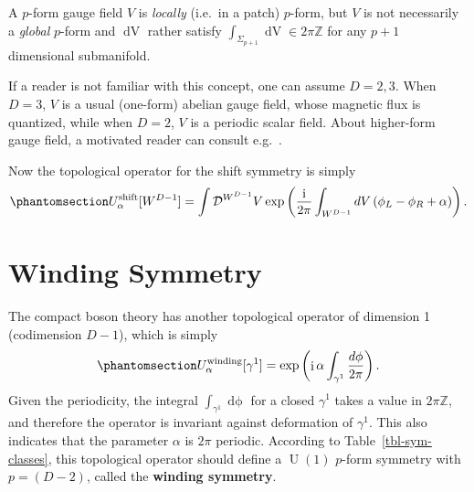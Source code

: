 \documentclass[11pt,toc=bibliography]{scrbook}
\DeclareMathOperator{\U}{U}
\DeclareMathOperator{\imunit}{i}
\newcommand{\stdim}{D}
\numberwithin{equation}{section}
\DeclareMathOperator{\U}{U}
\DeclareMathOperator{\imunit}{i}
\newcommand{\stdim}{D}
\begin{document}
\begin{tcolorbox}[enhanced jigsaw, opacityback=0, opacitybacktitle=0.6, leftrule=.75mm, arc=.35mm, coltitle=black, breakable, colframe=quarto-callout-note-color-frame, titlerule=0mm, colback=white, bottomrule=.15mm, left=2mm, colbacktitle=quarto-callout-note-color!10!white, toptitle=1mm, bottomtitle=1mm, title=\textcolor{quarto-callout-note-color}{\faInfo}\hspace{0.5em}{\(p\)-form gauge field}, rightrule=.15mm, toprule=.15mm]

A \(p\)-form gauge field \(V\) is \emph{locally} (i.e.~in a patch)
\(p\)-form, but \(V\) is not necessarily a \emph{global} \(p\)-form and
\(\mathop{dV}\) rather satisfy
\(\int_{\Sigma_{p+1}}\mathop{dV}\in 2\pi \mathbb{Z}\) for any \(p+1\)
dimensional submanifold.

If a reader is not familiar with this concept, one can assume
\(\stdim = 2,3\). When \(\stdim=3\), \(V\) is a usual (one-form) abelian
gauge field, whose magnetic flux is quantized, while when \(\stdim =2\),
\(V\) is a periodic scalar field. About higher-form gauge field, a
motivated reader can consult e.g.~\textcite{Hsieh:2020jpj}.

\end{tcolorbox}

Now the topological operator for the shift symmetry is simply
\begin{equation}\phantomsection\label{eq-shift-compact-boson}{
    U_\alpha^\text{shift}[{W^{\stdim-1}}] = \int \mathcal{D}^{W^{\stdim-1}}V \exp\left(\frac{\imunit}{2\pi}\int_{W^{\stdim-1}} \mathop{dV}\left(\phi_L-\phi_R + \alpha\right)\right).
}\end{equation}

\section{Winding Symmetry}\label{winding-symmetry}

The compact boson theory has another topological operator of dimension 1
(codimension \(\stdim-1\)), which is simply
\begin{equation}\phantomsection\label{eq-winding-op}{
U^\text{winding}_\alpha[\gamma^1] = \exp\left(\imunit\alpha \int_{\gamma^1}\frac{\mathop{d\phi}}{2\pi}\right).
}\end{equation} Given the periodicity, the integral
\(\int_{\gamma^1}\mathop{d\phi}\) for a closed \(\gamma^1\) takes a
value in \(2\pi \mathbb{Z}\), and therefore the operator is invariant
against deformation of \(\gamma^1\). This also indicates that the
parameter \(\alpha\) is \(2\pi\) periodic. According to
Table~\ref{tbl-sym-classes}, this topological operator should define a
\(\U(1)\) \(p\)-form symmetry with \(p=(\stdim-2)\), called the
\textbf{winding symmetry}.
\end{document}
